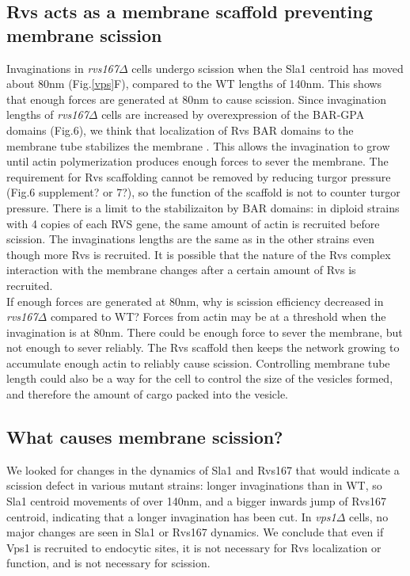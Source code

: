 \documentclass[9pt,lineno]{elife}
\begin{document}
\subsection{Rvs acts as a membrane scaffold preventing membrane scission}
Invaginations in \textit{rvs167$\Delta$} cells undergo scission when the Sla1 centroid has moved about 80nm (Fig.\ref{vps}F), compared to the WT lengths of 140nm. This shows that enough forces are generated at 80nm to cause scission. Since invagination lengths of \textit{rvs167$\Delta$} cells are increased by overexpression of the BAR-GPA domains (Fig.6), we think that localization of Rvs BAR domains to the membrane tube stabilizes the  membrane \cite{Boucrot2012,Dmitrieff2015}. This allows the invagination to grow until actin polymerization produces enough forces to sever the membrane. The requirement for Rvs scaffolding cannot be removed by reducing turgor pressure (Fig.6 supplement? or 7?),  so the function of the scaffold is not to counter turgor pressure. There is a limit to the stabilizaiton by BAR domains: in diploid strains with 4 copies of each RVS gene, the same amount of actin is recruited before scission. The invaginations lengths are the same as in the other strains even though more Rvs is recruited. It is possible that the nature of the Rvs complex interaction with the membrane changes after a certain amount of Rvs is recruited. 
~\\ 

If enough forces are generated at 80nm, why is scission efficiency decreased in \textit{rvs167$\Delta$}  compared to WT? Forces from actin may be at a threshold when the invagination is at 80nm. There could be enough force to sever the membrane, but not enough to sever reliably. The Rvs scaffold then keeps the network growing to accumulate enough actin to reliably cause scission. Controlling membrane  tube length could also be a way for the cell to control the size of the vesicles formed, and therefore the amount of cargo packed into the vesicle. 

\subsection{What causes membrane scission?}
We looked for changes in the dynamics of Sla1 and Rvs167 that would indicate a scission defect in various mutant strains: longer invaginations than in WT, so Sla1 centroid movements of over 140nm, and a bigger inwards jump of Rvs167 centroid, indicating that a longer invagination has been cut. In \textit{vps1$\Delta$}  cells, no major changes are seen in Sla1 or Rvs167 dynamics. We conclude that even if Vps1 is recruited to endocytic sites, it is not necessary for Rvs localization or function, and is not necessary for scission. 
\end{document}
